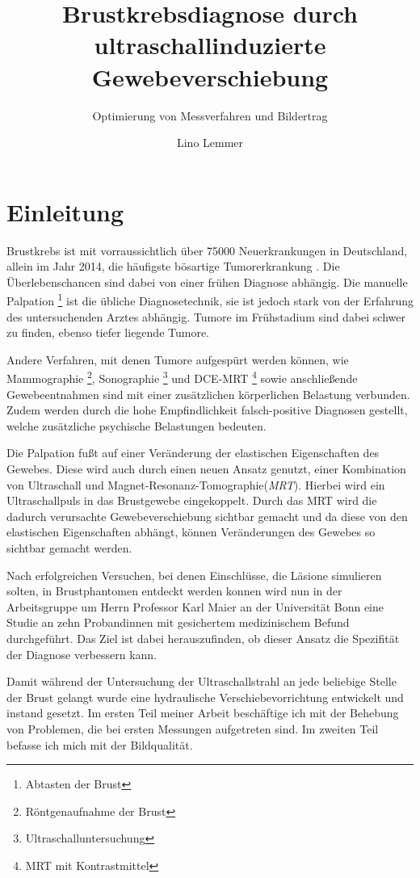 \documentclass[
    11pt,
    ngerman
]{scrreprt}
\author{Lino Lemmer}
\title{Brustkrebsdiagnose durch ultraschallinduzierte Gewebeverschiebung}
\subtitle{Optimierung von Messverfahren und Bildertrag}
\begin{document}
\maketitle


\tableofcontents

\chapter{Einleitung}

Brustkrebs ist mit vorraussichtlich über 75000 Neuerkrankungen in Deutschland,
allein im Jahr 2014, die häufigste bösartige Tumorerkrankung
\parencite[68]{krebs_in_deutschland}. Die Überlebenschancen sind dabei von
einer frühen Diagnose abhängig. Die manuelle Palpation \footnote{Abtasten der
Brust} ist die übliche Diagnosetechnik, sie ist jedoch stark von der Erfahrung
des untersuchenden Arztes abhängig. Tumore im Frühstadium sind dabei schwer zu
finden, ebenso tiefer liegende Tumore.

Andere Verfahren, mit denen Tumore aufgespürt werden können, wie Mammographie
\footnote{Röntgenaufnahme der Brust}, Sonographie
\footnote{Ultraschalluntersuchung} und DCE-MRT \footnote{MRT mit
Kontrastmittel} sowie anschließende Gewebeentnahmen sind mit einer zusätzlichen
körperlichen Belastung verbunden. Zudem werden durch die hohe Empfindlichkeit
falsch-positive Diagnosen gestellt, welche zusätzliche psychische Belastungen
bedeuten.

Die Palpation fußt auf einer Veränderung der elastischen Eigenschaften des
Gewebes.
Diese wird auch durch einen neuen Ansatz genutzt, einer Kombination
von Ultraschall und Magnet-Resonanz-Tomographie(\emph{MRT}). Hierbei wird ein
Ultraschallpuls in das Brustgewebe eingekoppelt. Durch das MRT wird die dadurch
verursachte Gewebeverschiebung sichtbar gemacht und da diese von den
elastischen Eigenschaften abhängt, können Veränderungen des Gewebes so sichtbar
gemacht werden.

Nach erfolgreichen Versuchen, bei denen Einschlüsse, die Läsione simulieren
solten, in Brustphantomen entdeckt werden konnen \parencite{dipl_ulucay} wird
nun in der Arbeitsgruppe um Herrn Professor Karl Maier an der Universität Bonn
eine Studie an zehn Probandinnen mit gesichertem medizinischem Befund
durchgeführt. Das Ziel ist dabei herauszufinden, ob dieser Ansatz die
Spezifität der Diagnose verbessern kann.

Damit während der Untersuchung der Ultraschallstrahl an jede beliebige Stelle
der Brust gelangt wurde eine hydraulische Verschiebevorrichtung entwickelt und
instand gesetzt. Im ersten Teil meiner Arbeit beschäftige ich mit der Behebung
von Problemen, die bei ersten Messungen aufgetreten sind. Im zweiten Teil
befasse ich mich mit der Bildqualität.
\end{document}
